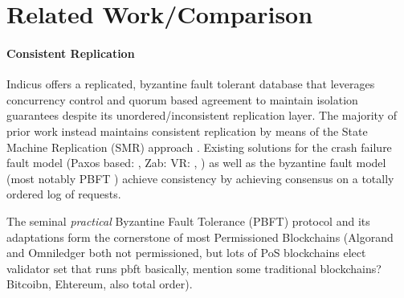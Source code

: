 
\section{Related Work/Comparison}  

\paragraph{Consistent Replication}
Indicus offers a replicated, byzantine fault tolerant database that leverages concurrency control and quorum based agreement to maintain isolation guarantees despite its unordered/inconsistent replication layer. 
The majority of prior work instead maintains consistent replication by means of the State Machine Replication (SMR) approach \cite{schneider1990implementing}. Existing solutions for the crash failure fault model (Paxos based: \cite{Li2007, Lampson2001, Lamport98Paxos, Lamport2005a, Lamport2005, Lamport01Paxos, Chandra2007} , Zab: \cite{junqueira2011zab}  VR: \cite{oki1988viewstampeda, liskov2012viewstamped}, \cite{van2014vive}) as well as the byzantine fault model \cite{lamport2011byzantizing, pires2018generalized, Guerraoui08Next, Kotla04High, bessani2014state, liskov2010viewstamped} (most notably PBFT \cite{castro1999practical}) achieve consistency by achieving consensus on a totally ordered log of requests. 

The seminal \textit{practical} Byzantine Fault Tolerance (PBFT) protocol and its adaptations form the cornerstone of most Permissioned Blockchains \cite{Hyperledger, EthereumQuorum, buchman2016tendermint, al2017chainspace, kokoris2018omniledger,  gilad2017algorand, baudet2019state} (Algorand and Omniledger both not permissioned, but lots of PoS blockchains elect validator set that runs pbft basically, mention some traditional blockchains? Bitcoibn, Ehtereum, also total order).




